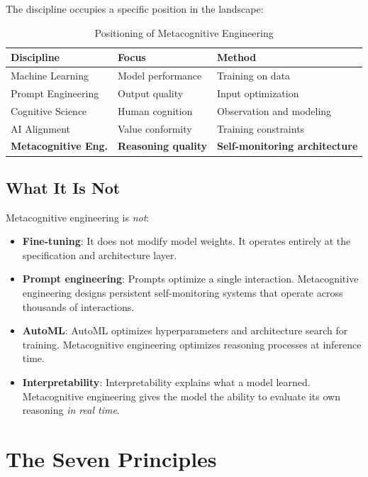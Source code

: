 \documentclass[12pt,a4paper]{article}
\theoremstyle{plain}
\theoremstyle{definition}
\theoremstyle{remark}
\begin{document}
The discipline occupies a specific position in the landscape:

\begin{table}[H]
\centering
\caption{Positioning of Metacognitive Engineering}
\begin{tabular}{@{}lll@{}}
\toprule
\textbf{Discipline} & \textbf{Focus} & \textbf{Method} \\
\midrule
Machine Learning & Model performance & Training on data \\
Prompt Engineering & Output quality & Input optimization \\
Cognitive Science & Human cognition & Observation and modeling \\
AI Alignment & Value conformity & Training constraints \\
\textbf{Metacognitive Eng.} & \textbf{Reasoning quality} & \textbf{Self-monitoring architecture} \\
\bottomrule
\end{tabular}
\end{table}

\subsection{What It Is Not}

Metacognitive engineering is \emph{not}:

\begin{itemize}[nosep]
\item \textbf{Fine-tuning}: It does not modify model weights. It operates entirely at the specification and architecture layer.
\item \textbf{Prompt engineering}: Prompts optimize a single interaction. Metacognitive engineering designs persistent self-monitoring systems that operate across thousands of interactions.
\item \textbf{AutoML}: AutoML optimizes hyperparameters and architecture search for training. Metacognitive engineering optimizes reasoning processes at inference time.
\item \textbf{Interpretability}: Interpretability explains what a model learned. Metacognitive engineering gives the model the ability to evaluate its own reasoning \emph{in real time}.
\end{itemize}

\section{The Seven Principles}
\end{document}
